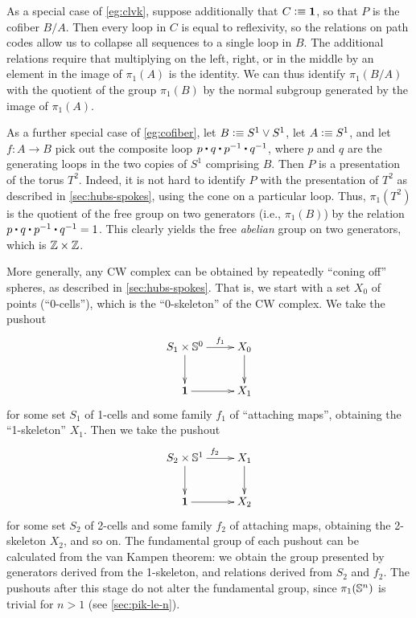 \documentclass[hott-all.tex]{subfiles}
\begin{document}
% 
\begin{eg}
  As a special case of \cref{eg:clvk}, suppose additionally that $C\vcentcolon\equiv\mathbf{1}$, so that $P$ is the cofiber $B/A$.
  Then every loop in $C$ is equal to reflexivity, so the relations on path codes allow us to collapse all sequences to a single loop in $B$.
  The additional relations require that multiplying on the left, right, or in the middle by an element in the image of $\pi_1(A)$ is the identity.
  We can thus identify $\pi_1(B/A)$ with the quotient of the group $\pi_1(B)$ by the normal subgroup generated by the image of $\pi_1(A)$.
\end{eg}
% 
\begin{eg}
  As a further special case of \cref{eg:cofiber}, let $B\vcentcolon\equiv S^1 \vee S^1$, let $A\vcentcolon\equiv S^1$, and let $f:A\to B$ pick out the composite loop $p \ct q \ct \opp p \ct \opp q$, where $p$ and $q$ are the generating loops in the two copies of $S^1$ comprising $B$.
  Then $P$ is a presentation of the torus $T^2$.
  Indeed, it is not hard to identify $P$ with the presentation of $T^2$ as described in \cref{sec:hubs-spokes}, using the cone on a particular loop.
  Thus, $\pi_1(T^2)$ is the quotient of the free group on two generators (i.e., $\pi_1(B)$) by the relation $p \ct q \ct \opp p \ct \opp q = 1$.
  This clearly yields the free \emph{abelian} group on two generators, which is $\mathbb{Z}\times\mathbb{Z}$.
\end{eg}
% 
% 
\begin{eg}
  More generally, any CW complex can be obtained by repeatedly ``coning off'' spheres, as described in \cref{sec:hubs-spokes}.
  That is, we start with a set $X_0$ of points (``0-cells''), which is the ``0-skeleton'' of the CW complex.
  We take the pushout
  \begin{equation*}
    \vcenter{\xymatrix{
        S_1 \times \Sn^0\ar[r]^-{f_1}\ar[d] &
        X_0\ar[d]\\
        \unit \ar[r] &
        X_1
      }}
  \end{equation*}
  for some set $S_1$ of 1-cells and some family $f_1$ of ``attaching maps'', obtaining the ``1-skeleton'' $X_1$.
  Then we take the pushout
  \begin{equation*}
    \vcenter{\xymatrix{
        S_2 \times \Sn^1\ar[r]^{f_2}\ar[d] &
        X_1\ar[d]\\
        \unit \ar[r] &
        X_2
      }}
  \end{equation*}
  for some set $S_2$ of 2-cells and some family $f_2$ of attaching maps, obtaining the 2-skeleton $X_2$, and so on.
  The fundamental group of each pushout can be calculated from the van Kampen theorem: we obtain the group presented by generators derived from the 1-skeleton, and relations derived from $S_2$ and $f_2$.
  The pushouts after this stage do not alter the fundamental group, since $\pi_1(\mathbb{S}^n)$ is trivial for $n>1$ (see \cref{sec:pik-le-n}).
\end{eg}
\end{document}
